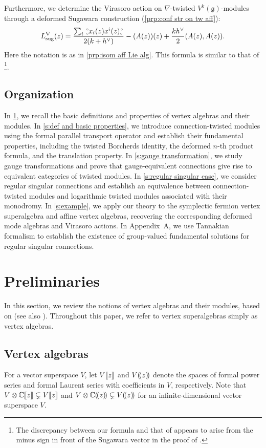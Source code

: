 \documentclass[final,reqno]{amsart}
\begin{document}
Furthermore, we determine the Virasoro action on $\nabla$-twisted $V^k(\mathfrak g)$-modules through a deformed Sugawara construction (\cref{prp:conf str on tw aff}):
\begin{equation}\label{eq:deformed Sugawara vector}
    L_{\mathrm{sug}}^\nabla(z)
    =
    \frac{\sum_i\,\substack{\scriptscriptstyle\circ \\ \scriptscriptstyle\circ} x_i(z)x^i(z) \substack{\scriptscriptstyle\circ \\ \scriptscriptstyle\circ\,}}{2(k+h^\vee)}
    -(A(z))(z)
    +\frac{k h^\vee}{2}(A(z),A(z)).
\end{equation}
Here the notation is as in \cref{prp:isom aff Lie alg}. This formula is similar to that of \cite{FL24}
\footnote{The discrepancy between our formula and that of \cite{FL24} appears to arise from the minus sign in front of the Sugawara vector in the proof of \cite[Theorem~5.3]{FL24}.}.

\subsection*{Organization} In \cref{s:preliminaries}, we recall the basic definitions and properties of vertex algebras and their modules. In \cref{s:def and basic properties}, we introduce connection-twisted modules using the formal parallel transport operator and establish their fundamental properties, including the twisted Borcherds identity, the deformed $n$-th product formula, and the translation property. In \cref{s:gauge transformation}, we study gauge transformations and prove that gauge-equivalent connections give rise to equivalent categories of twisted modules. In \cref{s:regular singular case}, we consider regular singular connections and establish an equivalence between connection-twisted modules and logarithmic twisted modules associated with their monodromy. In \cref{s:example}, we apply our theory to the symplectic fermion vertex superalgebra and affine vertex algebras, recovering the corresponding deformed mode algebras and Virasoro actions. In Appendix~A, we use Tannakian formalism to establish the existence of group-valued fundamental solutions for regular singular connections.



\section{Preliminaries}\label{s:preliminaries}
In this section, we review the notions of vertex algebras and their modules, based on \cite{LL04} (see also \cite{Kac98,FBZ04}). Throughout this paper, we refer to vertex superalgebras simply as vertex algebras.

\subsection{Vertex algebras}
For a vector superspace $V$, let $V\llbracket z \rrbracket$ and $V(\!( z )\!)$ denote the spaces of formal power series and formal Laurent series with coefficients in $V$, respectively. Note that $V\otimes\mathbb{C}\llbracket z \rrbracket\subsetneq V\llbracket z \rrbracket$ and $V\otimes\mathbb{C}(\!( z )\!)\subsetneq V(\!( z )\!)$ for an infinite-dimensional vector superspace \(V\).
\end{document}

